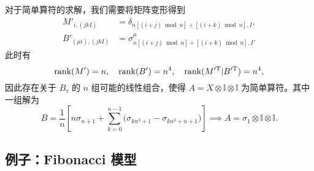 对于简单算符的求解，我们需要将矩阵变形得到
\begin{equation}
  \begin{aligned}
    M'_{i, (jkI)} &= \delta_{n[(i+j)\bmod n]+[(i+k)\bmod n], I}, \\
    B'_{(\mu i), (jkI)} &= \sigma^\mu_{n[(i+j)\bmod n]+[(i+k)\bmod n], I}.
  \end{aligned}
\end{equation}
此时有
\begin{equation}
  \operatorname{rank}(M') = n, \quad
  \operatorname{rank}(B') = n^4, \quad
  \operatorname{rank}(M'^{\mathrm{T}} | B'^{\mathrm{T}}) = n^4,
\end{equation}
因此存在关于 $B_\tau$ 的 $n$ 组可能的线性组合，使得 $A=X\otimes\mathbb{I}\otimes\mathbb{I}$ 为简单算符。其中一组解为
\begin{equation}
  B = \frac1n \left[ n \sigma_{n+1} + \sum_{k=0}^{n-1} \bigl( \sigma_{kn^3+1} - \sigma_{kn^3+n+1} \bigr) \right] \implies
  A = \sigma_1 \otimes \mathbb{I} \otimes \mathbb{I}.
\end{equation}

\subsection{例子：Fibonacci 模型}

